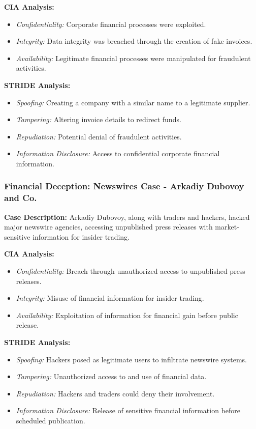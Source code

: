 \documentclass[11pt]{article}
\begin{document}
\textbf{CIA Analysis:}
\begin{itemize}
    \item \textit{Confidentiality:} Corporate financial processes were exploited.
    \item \textit{Integrity:} Data integrity was breached through the creation of fake invoices.
    \item \textit{Availability:} Legitimate financial processes were manipulated for fraudulent activities.
\end{itemize}

\textbf{STRIDE Analysis:}
\begin{itemize}
    \item \textit{Spoofing:} Creating a company with a similar name to a legitimate supplier.
    \item \textit{Tampering:} Altering invoice details to redirect funds.
    \item \textit{Repudiation:} Potential denial of fraudulent activities.
    \item \textit{Information Disclosure:} Access to confidential corporate financial information.
\end{itemize}

\subsubsection*{Financial Deception: Newswires Case - Arkadiy Dubovoy and Co.}
\textbf{Case Description:} Arkadiy Dubovoy, along with traders and hackers, hacked major newswire agencies, accessing unpublished press releases with market-sensitive information for insider trading.

\textbf{CIA Analysis:}
\begin{itemize}
    \item \textit{Confidentiality:} Breach through unauthorized access to unpublished press releases.
    \item \textit{Integrity:} Misuse of financial information for insider trading.
    \item \textit{Availability:} Exploitation of information for financial gain before public release.
\end{itemize}

\textbf{STRIDE Analysis:}
\begin{itemize}
    \item \textit{Spoofing:} Hackers posed as legitimate users to infiltrate newswire systems.
    \item \textit{Tampering:} Unauthorized access to and use of financial data.
    \item \textit{Repudiation:} Hackers and traders could deny their involvement.
    \item \textit{Information Disclosure:} Release of sensitive financial information before scheduled publication.
\end{itemize}
\end{document}
